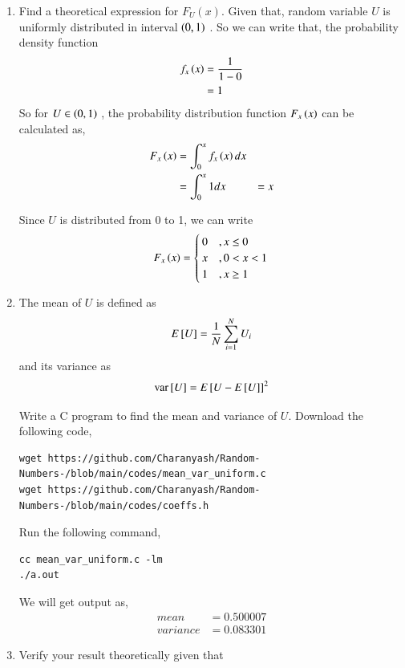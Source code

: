 \documentclass[journal,12pt,twocolumn]{IEEEtran}
\renewcommand\thesection{\arabic{section}}
\begin{document}
\begin{enumerate}[label=\thesection.\arabic*,ref=\thesection.\theenumi]
%
\item
Find a  theoretical expression for $F_{U}(x)$.
\solution Given that, random variable $U$ is uniformly distributed in interval $\left(0,1\right)$ . So we can write that, the probability density function
               \begin{align}
                        f_{x}\left(x\right) &= \frac{1}{1 -0}\\
                                      &= 1
               \end{align}
       So for $ U \in \left(0,1\right) $ , the probability distribution function $F_{x}\left(x\right)$ can be calculated as,
               \begin{align}
                           F_{x}\left(x\right) &= \int_{0}^{x} f_x\left(x\right)dx\\
                                         &= \int_{0}^{x}1dx\
                                         &= x
                \end{align}

            Since $U$ is distributed from 0 to 1, we can write
		\begin{equation*}
                                 F_{x}\left(x\right) = \begin{cases}
                                                          0  &, x \leq 0 \\
                                                          x  &, 0<x<1 \\
                                                          1  & , x \geq 1
                                                        \end{cases}
                 \end{equation*}

\item
The mean of $U$ is defined as
%
\begin{equation}
E{}\left[U\right] = \frac{1}{N}\sum_{i=1}^{N}U_i
\end{equation}
%
and its variance as
%
\begin{equation}
\text{var}{}\left[U\right] = E{}\left[U- E{}\left[U\right]\right]^2 
\end{equation}

Write a C program to  find the mean and variance of $U$. 
\solution Download the following code,
 \begin{lstlisting}
wget https://github.com/Charanyash/Random-Numbers-/blob/main/codes/mean_var_uniform.c
wget https://github.com/Charanyash/Random-Numbers-/blob/main/codes/coeffs.h
 \end{lstlisting}
Run the following command,
 \begin{lstlisting}
cc mean_var_uniform.c -lm
./a.out
 \end{lstlisting}
We will get output as,
\begin{align}
	mean &= 0.500007\\
     variance&= 0.083301
\end{align}
	
\item Verify your result theoretically given that
\end{enumerate}
\end{document}
